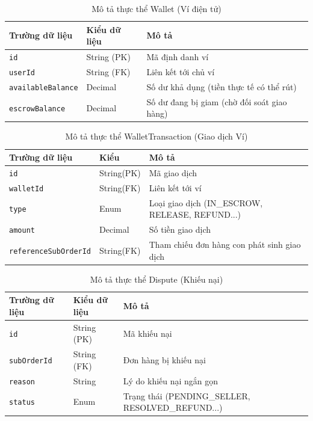 \documentclass[../main.tex]{subfiles}
\begin{document}
\begin{table}[H]
\centering
\caption{Mô tả thực thể Wallet (Ví điện tử)}
\begin{tabular}{|l|l|p{8cm}|}
\hline
\textbf{Trường dữ liệu} & \textbf{Kiểu dữ liệu} & \textbf{Mô tả} \\ \hline
\texttt{id} & String (PK) & Mã định danh ví \\ \hline
\texttt{userId} & String (FK) & Liên kết tới chủ ví \\ \hline
\texttt{availableBalance} & Decimal & Số dư khả dụng (tiền thực tế có thể rút) \\ \hline
\texttt{escrowBalance} & Decimal & Số dư đang bị giam (chờ đối soát giao hàng) \\ \hline
\end{tabular}
\end{table}

\begin{table}[H]
\centering
\caption{Mô tả thực thể WalletTransaction (Giao dịch Ví)}
\begin{tabular}{|l|l|p{7.5cm}|}
\hline
\textbf{Trường dữ liệu} & \textbf{Kiểu} & \textbf{Mô tả} \\ \hline
\texttt{id} & String(PK) & Mã giao dịch \\ \hline
\texttt{walletId} & String(FK) & Liên kết tới ví \\ \hline
\texttt{type} & Enum & Loại giao dịch (IN\_ESCROW, RELEASE, REFUND...) \\ \hline
\texttt{amount} & Decimal & Số tiền giao dịch \\ \hline
\texttt{referenceSubOrderId} & String(FK) & Tham chiếu đơn hàng con phát sinh giao dịch \\ \hline
\end{tabular}
\end{table}

\begin{table}[H]
\centering
\caption{Mô tả thực thể Dispute (Khiếu nại)}
\begin{tabular}{|l|l|p{8cm}|}
\hline
\textbf{Trường dữ liệu} & \textbf{Kiểu dữ liệu} & \textbf{Mô tả} \\ \hline
\texttt{id} & String (PK) & Mã khiếu nại \\ \hline
\texttt{subOrderId} & String (FK) & Đơn hàng bị khiếu nại \\ \hline
\texttt{reason} & String & Lý do khiếu nại ngắn gọn \\ \hline
\texttt{status} & Enum & Trạng thái (PENDING\_SELLER, RESOLVED\_REFUND...) \\ \hline
\end{tabular}
\end{table}
\end{document}
